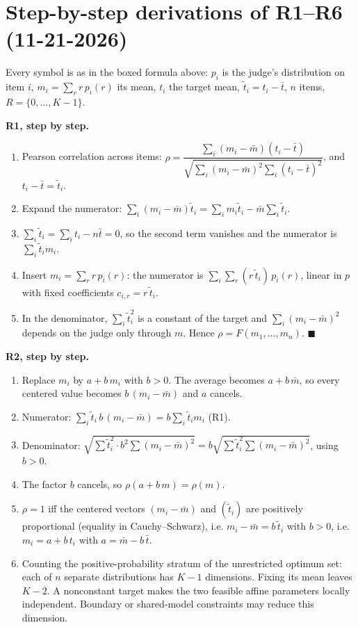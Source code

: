 \documentclass[11pt]{article}
\newcommand{\ttil}{\tilde t}
\begin{document}
\section{Step-by-step derivations of R1--R6 (11-21-2026)}
Every symbol is as in the boxed formula above: $p_i$ is the judge's distribution on item $i$, $m_i=\sum_r r\,p_i(r)$ its mean, $t_i$ the target mean, $\ttil_i=t_i-\bar t$, $n$ items, $R=\{0,\dots,K-1\}$.

\textbf{R1, step by step.}
\begin{enumerate}\setlength{\itemsep}{1pt}
\item Pearson correlation across items: $\rho=\dfrac{\sum_i(m_i-\bar m)(t_i-\bar t)}{\sqrt{\sum_i(m_i-\bar m)^2\sum_i(t_i-\bar t)^2}}$, and $t_i-\bar t=\ttil_i$.
\item Expand the numerator: $\sum_i(m_i-\bar m)\ttil_i=\sum_i m_i\ttil_i-\bar m\sum_i\ttil_i$.
\item $\sum_i\ttil_i=\sum_i t_i-n\bar t=0$, so the second term vanishes and the numerator is $\sum_i\ttil_i m_i$.
\item Insert $m_i=\sum_r r\,p_i(r)$: the numerator is $\sum_i\sum_r (r\,\ttil_i)\,p_i(r)$, linear in $p$ with fixed coefficients $c_{i,r}=r\,\ttil_i$.
\item In the denominator, $\sum_i\ttil_i^2$ is a constant of the target and $\sum_i(m_i-\bar m)^2$ depends on the judge only through $m$. Hence $\rho=F(m_1,\dots,m_n)$. \hfill$\blacksquare$
\end{enumerate}

\textbf{R2, step by step.}
\begin{enumerate}\setlength{\itemsep}{1pt}
\item Replace $m_i$ by $a+b\,m_i$ with $b>0$. The average becomes $a+b\,\bar m$, so every centered value becomes $b\,(m_i-\bar m)$ and $a$ cancels.
\item Numerator: $\sum_i\ttil_i\,b\,(m_i-\bar m)=b\sum_i\ttil_i m_i$ (R1).
\item Denominator: $\sqrt{\sum\ttil_i^2\cdot b^2\sum(m_i-\bar m)^2}=b\sqrt{\sum\ttil_i^2\sum(m_i-\bar m)^2}$, using $b>0$.
\item The factor $b$ cancels, so $\rho(a+b\,m)=\rho(m)$.
\item $\rho=1$ iff the centered vectors $(m_i-\bar m)$ and $(\ttil_i)$ are positively proportional (equality in Cauchy--Schwarz), i.e. $m_i-\bar m=b\,\ttil_i$ with $b>0$, i.e. $m_i=a+b\,t_i$ with $a=\bar m-b\,\bar t$.
\item Counting the positive-probability stratum of the unrestricted optimum set: each of $n$ separate distributions has $K-1$ dimensions. Fixing its mean leaves $K-2$. A nonconstant target makes the two feasible affine parameters locally independent. Boundary or shared-model constraints may reduce this dimension.
\end{enumerate}
\end{document}
